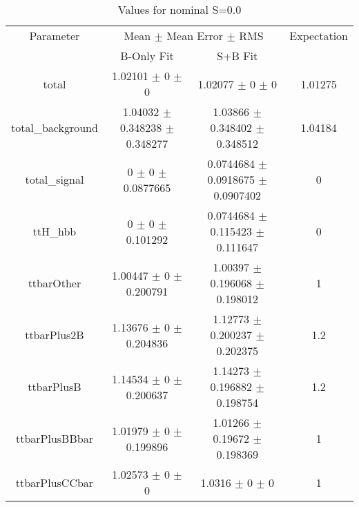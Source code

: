 \begin{table}
\centering
\caption{Values for nominal S=0.0}
\begin{tabular}{cccc}
\toprule
Parameter & \multicolumn{2}{c}{Mean $\pm$ Mean Error $\pm$ RMS} & Expectation\\
 & B-Only Fit & S+B Fit & \\
\midrule
total & \num{1.02101} $\pm$ \num{0} $\pm$ \num{0} & \num{1.02077} $\pm$ \num{0} $\pm$ \num{0} & \num{1.01275}\\
total\_background & \num{1.04032} $\pm$ \num{0.348238} $\pm$ \num{0.348277} & \num{1.03866} $\pm$ \num{0.348402} $\pm$ \num{0.348512} & \num{1.04184}\\
total\_signal & \num{0} $\pm$ \num{0} $\pm$ \num{0.0877665} & \num{0.0744684} $\pm$ \num{0.0918675} $\pm$ \num{0.0907402} & \num{0}\\
ttH\_hbb & \num{0} $\pm$ \num{0} $\pm$ \num{0.101292} & \num{0.0744684} $\pm$ \num{0.115423} $\pm$ \num{0.111647} & \num{0}\\
ttbarOther & \num{1.00447} $\pm$ \num{0} $\pm$ \num{0.200791} & \num{1.00397} $\pm$ \num{0.196068} $\pm$ \num{0.198012} & \num{1}\\
ttbarPlus2B & \num{1.13676} $\pm$ \num{0} $\pm$ \num{0.204836} & \num{1.12773} $\pm$ \num{0.200237} $\pm$ \num{0.202375} & \num{1.2}\\
ttbarPlusB & \num{1.14534} $\pm$ \num{0} $\pm$ \num{0.200637} & \num{1.14273} $\pm$ \num{0.196882} $\pm$ \num{0.198754} & \num{1.2}\\
ttbarPlusBBbar & \num{1.01979} $\pm$ \num{0} $\pm$ \num{0.199896} & \num{1.01266} $\pm$ \num{0.19672} $\pm$ \num{0.198369} & \num{1}\\
ttbarPlusCCbar & \num{1.02573} $\pm$ \num{0} $\pm$ \num{0} & \num{1.0316} $\pm$ \num{0} $\pm$ \num{0} & \num{1}\\
\bottomrule
\end{tabular}
\end{table}